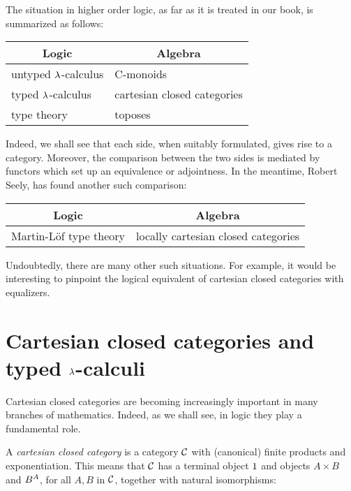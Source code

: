The situation in higher order logic, as far as it is treated in our book,
is summarized as follows:

\medskip
\renewcommand{\arraystretch}{1.5}

\begin{center}
\begin{tabular}{ l | l }
 \hline
\multicolumn{1}{c|}{Logic} & \multicolumn{1}{c}{Algebra} \\
 \hline
 untyped $\lambda$-calculus & C-monoids \\
 typed $\lambda$-calculus & cartesian closed categories \\
 type theory & toposes \\
 \hline
\end{tabular}
\end{center}
\medskip

\noindent
Indeed, we shall see that each side, when suitably formulated, gives rise to a
category. Moreover, the comparison between the two sides is mediated by
functors which set up an equivalence or adjointness. In the meantime, Robert
Seely, has found another such comparison:

\begin{center}
\begin{tabular}{ c | c }
 \hline
{Logic} & {Algebra} \\
 \hline
Martin-L\"of type theory  & locally cartesian closed categories \\
 \hline
\end{tabular}
\end{center}
\medskip

\noindent
Undoubtedly, there are many other such situations. For example, it would be
interesting to pinpoint the logical equivalent of cartesian closed categories
with equalizers.

\section{Cartesian closed categories and typed $\lambda$-calculi}

Cartesian closed categories are becoming increasingly important in many
branches of mathematics. Indeed, as we shall see, in logic they play a fundamental
role.

A {\em cartesian closed category} is a category $\mathcal C$ with (canonical) finite
products and exponentiation. This means that $\mathcal C$ has a terminal object $1$ and
objects $A \times B$ and $B^{A}$, for all $A,B$ in $\mathcal C$, together
with natural isomorphisms:

